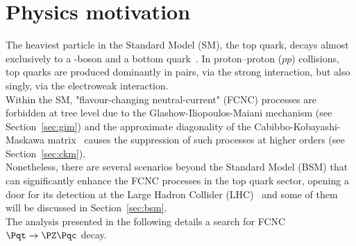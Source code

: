 \newpage
\section{Physics motivation}
The heaviest particle in the Standard Model (SM), the top quark, decays almost exclusively to a \PW-boson and a bottom quark~\cite{pdg2}. In proton--proton ($pp$) collisions, top quarks are produced dominantly in pairs, via the strong interaction, but also singly, via the electroweak interaction. \\%
Within the SM, "flavour-changing neutral-current" (FCNC) processes are forbidden at tree level due to the Glashow-Iliopoulos-Maiani mechanism \cite{gim} (see Section~\ref{sec:gim}) and the approximate diagonality of the Cabibbo-Kobayashi-Maskawa matrix~\cite{pdg2} causes the suppression of such processes at higher orders (see Section~\ref{sec:ckm}).\\
Nonetheless, there are several scenarios beyond the Standard Model (BSM) that can significantly enhance the FCNC processes in the top quark sector, opening a door for its detection at the Large Hadron Collider (LHC)~\cite{aguilar,barger,h2dm_limit,mssm_limit,RPV_limit, extra_limit} and some of them will be discussed in Section~\ref{sec:bsm}. \\
The analysis presented in the following details a search for FCNC $\Pqt\rightarrow \PZ\Pqc$ decay. 
%

